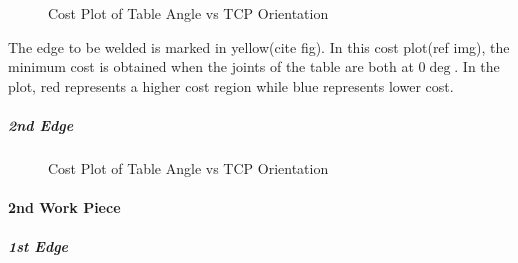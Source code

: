 \begin{figure}[!htbp] %
 \centering
   \caption{Cost Plot of Table Angle vs TCP Orientation}  
\label{fig:img13}
\end{figure}
The edge to be welded is marked in yellow(cite fig). In this cost plot(ref img), the minimum cost is obtained when the joints of the table are both at 0$\deg$. In the plot, red represents a higher cost region while blue represents lower cost.
\subparagraph{2nd Edge}
\begin{figure}[!htbp] %
 \centering
   \caption{Cost Plot of Table Angle vs TCP Orientation}
\label{fig:img14}
\end{figure}
\paragraph{2nd Work Piece}
\subparagraph{1st Edge}

